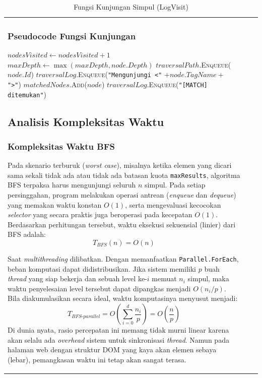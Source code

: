 \documentclass[12pt]{article}
\begin{document}
\begin{table}[H]
\begin{tabular}{|l|c|c|}
\begin{document}
\subsubsection{Pseudocode Fungsi Kunjungan}
\begin{algorithm}[H]
\caption{Fungsi Kunjungan Simpul (LogVisit)}
\label{alg:logvisit}
\begin{algorithmic}[1]
\Procedure{LogVisit}{$node$}
    \State $nodesVisited \gets nodesVisited + 1$ \Comment{Penambahan atomik}
    \State $maxDepth \gets \max(maxDepth, node.Depth)$ \Comment{Pembaruan atomik}
    \State $traversalPath$.\textsc{Enqueue}($node.Id$)
    \State $traversalLog$.\textsc{Enqueue}(\texttt{"Mengunjungi <"} $+ node.TagName +$ \texttt{">"})
    \If{\textsc{Matches}($node, selector$)}
        \State $matchedNodes$.\textsc{Add}($node$)
        \State $traversalLog$.\textsc{Enqueue}(\texttt{"[MATCH] ditemukan"})
    \EndIf
\EndProcedure
\end{algorithmic}
\end{algorithm}


\subsection{Analisis Kompleksitas Waktu}

\subsubsection{Kompleksitas Waktu BFS}

Pada skenario terburuk (\textit{worst case}), misalnya ketika elemen yang dicari sama sekali tidak ada atau tidak ada batasan kuota \texttt{maxResults}, algoritma BFS terpaksa harus mengunjungi seluruh $n$ simpul. Pada setiap persinggahan, program melakukan operasi antrean (\textit{enqueue} dan \textit{dequeue}) yang memakan waktu konstan $O(1)$, serta mengevaluasi kecocokan \textit{selector} yang secara praktis juga beroperasi pada kecepatan $O(1)$. Berdasarkan perhitungan tersebut, waktu eksekusi sekuensial (linier) dari BFS adalah:
\[
T_{BFS}(n) = O(n)
\]

Saat \textit{multithreading} dilibatkan. Dengan memanfaatkan \texttt{Parallel.ForEach}, beban komputasi dapat didistribusikan. Jika sistem memiliki $p$ buah \textit{thread} yang siap bekerja dan sebuah level ke-$i$ memuat $n_i$ simpul, maka waktu penyelesaian level tersebut dapat dipangkas menjadi $O(n_i / p)$. Bila diakumulasikan secara ideal, waktu komputasinya menyusut menjadi:
\[
T_{BFS\text{-}parallel} = O\!\left(\sum_{i=0}^{d} \frac{n_i}{p}\right) = O\!\left(\frac{n}{p}\right)
\]
Di dunia nyata, rasio percepatan ini memang tidak murni linear karena akan selalu ada \textit{overhead} sistem untuk sinkronisasi \textit{thread}. Namun pada halaman web dengan struktur DOM yang kaya akan elemen sebaya (lebar), pemangkasan waktu ini tetap akan sangat terasa.


\end{document}
\end{tabular}
\end{table}
\end{document}
